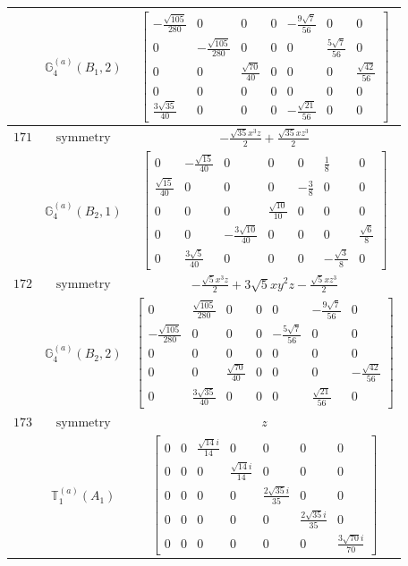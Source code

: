 \documentclass[fleqn,8pt,landscape]{jsarticle}
\begin{document}
\begin{longtable}{ccc}
$  $ & $ \mathbb{G}_{4}^{(a)}(B_{1},2) $ & $ \begin{bmatrix} - \frac{\sqrt{105}}{280} & 0 & 0 & 0 & - \frac{9 \sqrt{7}}{56} & 0 & 0 \\ 0 & - \frac{\sqrt{105}}{280} & 0 & 0 & 0 & \frac{5 \sqrt{7}}{56} & 0 \\ 0 & 0 & \frac{\sqrt{70}}{40} & 0 & 0 & 0 & \frac{\sqrt{42}}{56} \\ 0 & 0 & 0 & 0 & 0 & 0 & 0 \\ \frac{3 \sqrt{35}}{40} & 0 & 0 & 0 & - \frac{\sqrt{21}}{56} & 0 & 0 \end{bmatrix} $ \\ \hline
$ 171 $ & $ \text{symmetry} $ & $ - \frac{\sqrt{35} x^{3} z}{2} + \frac{\sqrt{35} x z^{3}}{2} $ \\
$  $ & $ \mathbb{G}_{4}^{(a)}(B_{2},1) $ & $ \begin{bmatrix} 0 & - \frac{\sqrt{15}}{40} & 0 & 0 & 0 & \frac{1}{8} & 0 \\ \frac{\sqrt{15}}{40} & 0 & 0 & 0 & - \frac{3}{8} & 0 & 0 \\ 0 & 0 & 0 & \frac{\sqrt{10}}{10} & 0 & 0 & 0 \\ 0 & 0 & - \frac{3 \sqrt{10}}{40} & 0 & 0 & 0 & \frac{\sqrt{6}}{8} \\ 0 & \frac{3 \sqrt{5}}{40} & 0 & 0 & 0 & - \frac{\sqrt{3}}{8} & 0 \end{bmatrix} $ \\ \hline
$ 172 $ & $ \text{symmetry} $ & $ - \frac{\sqrt{5} x^{3} z}{2} + 3 \sqrt{5} x y^{2} z - \frac{\sqrt{5} x z^{3}}{2} $ \\
$  $ & $ \mathbb{G}_{4}^{(a)}(B_{2},2) $ & $ \begin{bmatrix} 0 & \frac{\sqrt{105}}{280} & 0 & 0 & 0 & - \frac{9 \sqrt{7}}{56} & 0 \\ - \frac{\sqrt{105}}{280} & 0 & 0 & 0 & - \frac{5 \sqrt{7}}{56} & 0 & 0 \\ 0 & 0 & 0 & 0 & 0 & 0 & 0 \\ 0 & 0 & \frac{\sqrt{70}}{40} & 0 & 0 & 0 & - \frac{\sqrt{42}}{56} \\ 0 & \frac{3 \sqrt{35}}{40} & 0 & 0 & 0 & \frac{\sqrt{21}}{56} & 0 \end{bmatrix} $ \\ \hline
$ 173 $ & $ \text{symmetry} $ & $ z $ \\
$  $ & $ \mathbb{T}_{1}^{(a)}(A_{1}) $ & $ \begin{bmatrix} 0 & 0 & \frac{\sqrt{14} i}{14} & 0 & 0 & 0 & 0 \\ 0 & 0 & 0 & \frac{\sqrt{14} i}{14} & 0 & 0 & 0 \\ 0 & 0 & 0 & 0 & \frac{2 \sqrt{35} i}{35} & 0 & 0 \\ 0 & 0 & 0 & 0 & 0 & \frac{2 \sqrt{35} i}{35} & 0 \\ 0 & 0 & 0 & 0 & 0 & 0 & \frac{3 \sqrt{70} i}{70} \end{bmatrix} $ \\ \hline

\end{longtable}
\end{document}
